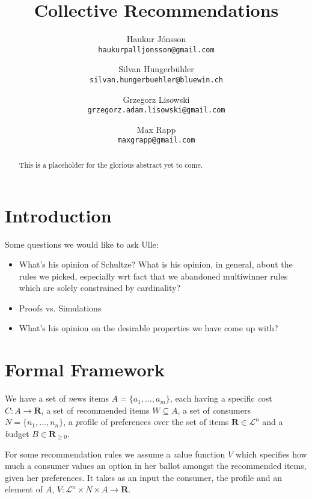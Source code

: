 \documentclass{article}
\title{Collective Recommendations}
\author{
    Haukur J{\'o}nsson \\    \texttt{haukurpalljonsson@gmail.com}
    \and
    Silvan Hungerb{\"u}hler \\   \texttt{silvan.hungerbuehler@bluewin.ch}
    \and
    Grzegorz Lisowski \\  \texttt{grzegorz.adam.lisowski@gmail.com}
    \and
    Max Rapp \\  \texttt{maxgrapp@gmail.com}
}
\begin{document}
\maketitle

\begin{abstract}
This is a placeholder for the glorious abstract yet to come.
\end{abstract}

\section{Introduction}\label{introduction}
Some questions we would like to ask Ulle:
\begin{itemize}
\item What's his opinion of Schultze? What is his opinion, in general, about the rules we picked, especially wrt fact that we abandoned multiwinner rules which are solely constrained by cardinality?
\item Proofs vs. Simulations
\item  What's his opinion on the desirable properties we have come up with?
\end{itemize}





\section{Formal Framework}
We have a set of {\emph news items} $A=\{a_1,...,a_m\}$, 
each having a specific {\emph cost}
 $C: A \rightarrow {\mathbf R}$,  %
a set of {\emph recommended items} $W\subseteq A$, 
a set of {\emph consumers} $N=\{n_1,...,n_n\}$, 
a {\emph profile of preferences} over the set of items $\mathbf{R}\in \mathcal{L}^n$ 
and a {\emph budget} $B\in \mathbf{R}_{\geq 0}$. %

For some recommendation rules we assume a {\emph value function} $V$ 
which specifies how much a consumer values an option in her ballot amongst the recommended items, given her preferences.
 It takes as an input the consumer, the profile and an element of $A$,
   $V: \mathcal{L}^n \times N \times  A \rightarrow \mathbf{R}$. %
 
\end{document}
